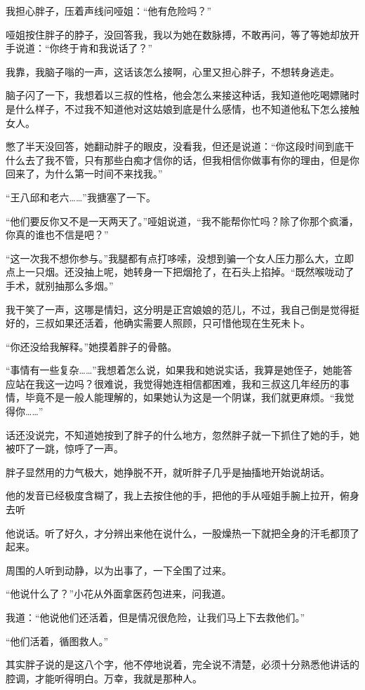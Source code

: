 我担心胖子，压着声线问哑姐：“他有危险吗？”

哑姐按住胖子的脖子，没回答我，我以为她在数脉搏，不敢再问，等了等她却放开手说道：“你终于肯和我说话了？”

我靠，我脑子嗡的一声，这话该怎么接啊，心里又担心胖子，不想转身逃走。

脑子闪了一下，我想着以三叔的性格，他会怎么来接这种话，我知道他吃喝嫖赌时是什么样子，不过我不知道他对这姑娘到底是什么感情，也不知道他私下怎么接触女人。

憋了半天没回答，她翻动胖子的眼皮，没看我，但还是说道：“你这段时间到底干什么去了我不管，只有那些白痴才信你的话，但我相信你做事有你的理由，但是你回来了，为什么第一时间不来找我。”

“王八邱和老六……”我搪塞了一下。

“他们要反你又不是一天两天了。”哑姐说道，“我不能帮你忙吗？除了你那个疯潘，你真的谁也不信是吧？”

“这一次我不想你参与。”我腿都有点打哆嗦，没想到骗一个女人压力那么大，立即点上一只烟。还没抽上呢，她转身一下把烟抢了，在石头上掐掉。“既然喉咙动了手术，就别抽那么多烟。”

我干笑了一声，这哪是情妇，这分明是正宫娘娘的范儿，不过，我自己倒是觉得挺好的，三叔如果还活着，他确实需要人照顾，只可惜他现在生死未卜。

“你还没给我解释。”她摸着胖子的骨骼。

“事情有一些复杂……”我想着怎么说，如果我和她说实话，我算是她侄子，她能答应站在我这一边吗？很难说，我觉得她连相信都困难，我和三叔这几年经历的事情，毕竟不是一般人能理解的，如果她认为这是一个阴谋，我们就更麻烦。“我觉得你……”

话还没说完，不知道她按到了胖子的什么地方，忽然胖子就一下抓住了她的手，她被吓了一跳，惊呼了一声。

胖子显然用的力气极大，她挣脱不开，就听胖子几乎是抽搐地开始说胡话。

他的发音已经极度含糊了，我上去按住他的手，把他的手从哑姐手腕上拉开，俯身去听

他说话。听了好久，才分辨出来他在说什么，一股燥热一下就把全身的汗毛都顶了起来。

周围的人听到动静，以为出事了，一下全围了过来。

“他说什么了？”小花从外面拿医药包进来，问我道。

我道：“他说他们还活着，但是情况很危险，让我们马上下去救他们。”

“他们活着，循图救人。”

其实胖子说的是这八个字，他不停地说着，完全说不清楚，必须十分熟悉他讲话的腔调，才能听得明白。万幸，我就是那种人。

